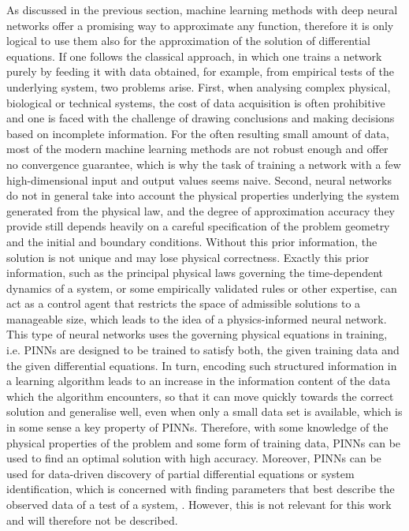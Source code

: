 As discussed in the previous section, machine learning methods with deep neural networks offer a promising way to approximate any function, therefore it is only logical to use them also for the approximation of the solution of differential equations. If one follows the classical approach, in which one trains a network purely by feeding it with data obtained, for example, from empirical tests of the underlying system, two problems arise. First, when analysing complex physical, biological or technical systems, the cost of data acquisition is often prohibitive and one is faced with the challenge of drawing conclusions and making decisions based on incomplete information. For the often resulting small amount of data, most of the modern machine learning methods are not robust enough and offer no convergence guarantee, which is why the task of training a network with a few high-dimensional input and output values seems naive. Second, neural networks do not in general take into account the physical properties underlying the system generated from the physical law, and the degree of approximation accuracy they provide still depends heavily on a careful specification of the problem geometry and the initial and boundary conditions. Without this prior information, the solution is not unique and may lose physical correctness. Exactly this prior information, such as the principal physical laws governing the time-dependent dynamics of a system, or some empirically validated rules or other expertise, can act as a control agent that restricts the space of admissible solutions to a manageable size, which leads to the idea of a physics-informed neural network. This type of neural networks uses the governing physical equations in training, i.e. PINNs are designed to be trained to satisfy both, the given training data and the given differential equations. In turn, encoding such structured information in a learning algorithm leads to an increase in the information content of the data which the algorithm encounters, so that it can move quickly towards the correct solution and generalise well, even when only a small data set is available, which is in some sense a key property of PINNs. Therefore, with some knowledge of the physical properties of the problem and some form of training data, PINNs can be used to find an optimal solution with high accuracy. Moreover, PINNs can be used for data-driven discovery of partial differential equations or system identification, which is concerned with finding parameters that best describe the observed data of a test of a system, \cite[pp.~1-2]{RaissiPerdikarisKarniadakisPart1:2017}. However, this is not relevant for this work and will therefore not be described. \\
